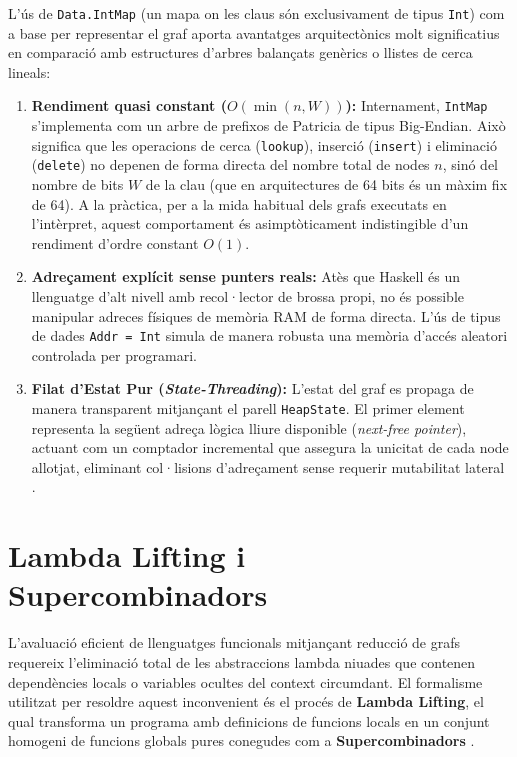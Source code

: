 L'ús de \texttt{Data.IntMap} (un mapa on les claus són exclusivament de tipus \texttt{Int}) com a base per representar el graf aporta avantatges arquitectònics molt significatius en comparació amb estructures d'arbres balançats genèrics o llistes de cerca lineals:
\begin{enumerate}
    \item \textbf{Rendiment quasi constant ($O(\min(n, W))$):} Internament, \texttt{IntMap} s'implementa com un arbre de prefixos de Patricia de tipus Big-Endian. Això significa que les operacions de cerca (\texttt{lookup}), inserció (\texttt{insert}) i eliminació (\texttt{delete}) no depenen de forma directa del nombre total de nodes $n$, sinó del nombre de bits $W$ de la clau (que en arquitectures de 64 bits és un màxim fix de 64). A la pràctica, per a la mida habitual dels grafs executats en l'intèrpret, aquest comportament és asimptòticament indistingible d'un rendiment d'ordre constant \textbf{$O(1)$}.
    \item \textbf{Adreçament explícit sense punters reals:} Atès que Haskell és un llenguatge d'alt nivell amb recol·lector de brossa propi, no és possible manipular adreces físiques de memòria RAM de forma directa. L'ús de tipus de dades \texttt{Addr = Int} simula de manera robusta una memòria d'accés aleatori controlada per programari.
    \item \textbf{Filat d'Estat Pur (\textit{State-Threading}):} L'estat del graf es propaga de manera transparent mitjançant el parell \texttt{HeapState}. El primer element representa la següent adreça lògica lliure disponible (\textit{next-free pointer}), actuant com un comptador incremental que assegura la unicitat de cada node allotjat, eliminant col·lisions d'adreçament sense requerir mutabilitat lateral \cite{wadler1992essence}.
\end{enumerate}

\section{Lambda Lifting i Supercombinadors}

L'avaluació eficient de llenguatges funcionals mitjançant reducció de grafs requereix l'eliminació total de les abstraccions lambda niuades que contenen dependències locals o variables ocultes del context circumdant. El formalisme utilitzat per resoldre aquest inconvenient és el procés de \textbf{Lambda Lifting}, el qual transforma un programa amb definicions de funcions locals en un conjunt homogeni de funcions globals pures conegudes com a \textbf{Supercombinadors} \cite{peyton1987implementation}.

